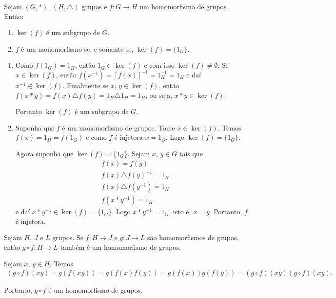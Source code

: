 \begin{proposicao}
    Sejam $(G, *)$, $(H, \triangle)$ grupos e $f : G \to H$ um homomorfismo de grupos. Então:
    \begin{enumerate}[label={\roman*})]
        \item $\ker(f)$ é um subgrupo de $G$.
        \item $f$ é um monomorfismo se, e somente se, $\ker(f) = \{1_G\}$.
    \end{enumerate}
\end{proposicao}
\begin{prova}
    \begin{enumerate}[label={\roman*})]
        \item Como $f(1_G) = 1_H$, então $1_G \in \ker(f)$ e com isso $\ker(f) \ne \emptyset$. Se $x \in \ker(f)$, então $f(x^{-1}) = [f(x)]^{-1} = 1_H^{-1} = 1_H$ e daí $x^{-1} \in \ker(f)$. Finalmente se $x$, $y \in \ker(f)$, então $f(x*y) = f(x)\triangle f(y) = 1_H \triangle 1_H = 1_H$, ou seja, $x * y \in \ker(f)$.

        Portanto $\ker(f)$ é um subgrupo de $G$.

        \item Suponha que $f$ é um monomorfismo de grupos. Tome $x \in \ker(f)$. Temos $f(x) = 1_H = f(1_G)$ e como $f$ é injetora $x = 1_G$. Logo $\ker(f) = \{1_G\}$.

        Agora suponha que $\ker(f) = \{1_G\}$. Sejam $x$, $y \in G$ tais que
        \begin{align*}
            &f(x) = f(y)\\
            &f(x)\triangle f(y)^{-1} = 1_H\\
            &f(x)\triangle f(y^{-1}) = 1_H\\
            &f(x * y^{-1}) = 1_H
        \end{align*}
        e daí $x*y^{-1} \in \ker(f) = \{1_G\}$. Logo $x*y^{-1} = 1_G$, isto é, $x = y$. Portanto, $f$ é injetora.
    \end{enumerate}
\end{prova}

\begin{proposicao}
    Sejam $H$, $J$ e $L$ grupos. Se $f : H \to J$ e $g : J \to L$ são homomorfismos de grupos, então $g \circ f : H \to L$ também é um homomorfismo de grupos.
\end{proposicao}
\begin{prova}
    Sejam $x$, $y \in H$. Temos
    \begin{align*}
        (g \circ f)(xy) = g(f(xy)) = g(f(x)f(y)) = g(f(x))g(f(y)) = (g \circ f)(xy)(g \circ f)(xy).
    \end{align*}

    Portanto, $g \circ f$ é um homomorfismo de grupos.
\end{prova}


